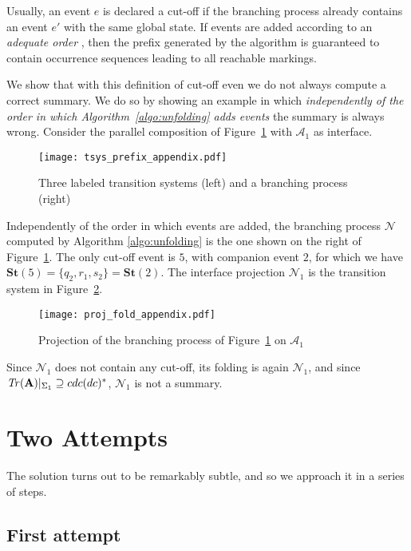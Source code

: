 \documentclass{llncs}
\def\A{\mathcal{A}}
\def\prod{\mathbf{A}}
\def\N{\mathcal{N}}
\newcommand{\st}[1]{\mathbf{St}(#1)}
\newcommand{\Tr}[1]{{\it Tr}(#1)}
\begin{document}
Usually, an event $e$ is declared a cut-off if the 
branching process already contains an event $e'$ with the 
same global state. If events are added according to an {\em adequate order} \cite{Esparza08}, then the prefix generated by the algorithm is guaranteed to contain occurrence sequences leading to all reachable markings.

We show that with this definition of cut-off even we do not always compute
a correct summary. We do so by showing an example in which {\em independently of the order in which Algorithm~\ref{algo:unfolding} adds events} the summary is always wrong. Consider the parallel composition of Figure~\ref{fig:transitionsystemsapp} with $\A_1$ as interface.

\begin{figure}[htbp]
\centering
\texttt{[image: tsys\_prefix\_appendix.pdf]}
\caption{Three labeled transition systems (left) and a branching process (right)}\label{fig:transitionsystemsapp}
\end{figure}
  
Independently of the order in which events are added, the branching process $\N$ computed  
by Algorithm \ref{algo:unfolding} is the one shown on the right of Figure~\ref{fig:transitionsystemsapp}. The only cut-off event is $5$, with companion event $2$, for which we 
have  $\st{5}=\{q_2, r_1, s_2\}=\st{2}$.  The interface projection $\N_1$ is the transition system in Figure~\ref{fig:projectionapp}. 

\begin{figure}[htbp]
\centering
\texttt{[image: proj\_fold\_appendix.pdf]}
\caption{Projection of the branching process of Figure~\ref{fig:transitionsystemsapp} on 
$\A_1$}\label{fig:projectionapp}
\end{figure}

Since $\N_1$ does not contain any cut-off, its folding is again
$\N_1$, and since $\Tr{\prod}|_{\Sigma_1}\supseteq cdc(dc)^*$, $\N_1$ is
not a summary.

\section{Two Attempts}

The solution turns out to be remarkably subtle, and so we approach it in a series of steps.

\subsection{First attempt} 
\end{document}
